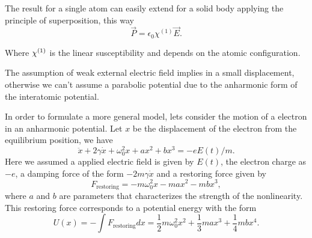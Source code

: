 The result for a single atom can easily extend for a solid body applying the principle of  superposition, this way
\begin{equation}
    \vec{P} = \epsilon_0\chi^{(1)}\vec{E}.
\end{equation}

Where $\chi^{( 1)}$ is the linear susceptibility and depends on the atomic configuration.

The assumption of weak external electric field implies in a small displacement, otherwise we can't assume a parabolic potential due to the anharmonic form of the interatomic potential. 

In order to formulate a more general model, lets consider the motion of a electron in an anharmonic potential. Let $x$ be the displacement of the electron from the equilibrium position, we have
\begin{equation}
    \ddot{x} + 2\gamma\dot{x} + \omega_0^2x+ax^2+bx^3 = -eE(t)/m.
    \label{eq:motion_equation_electron}
\end{equation}
Here we assumed a applied electric field is given by $E(t)$, the electron charge as $-e$, a damping force of the form $-2m\gamma\dot{x}$ and a restoring force given by
\begin{equation}
    F_\text{restoring} = -m\omega_0^2x -max^2 -mbx^3, 
\end{equation}
where $a$ and $b$ are parameters that characterizes the strength of the nonlinearity. This restoring force corresponds to a potential energy with the form 
\begin{equation}
    U(x) = -\int F_\text{restoring} dx = \frac{1}{2}m\omega_0^2x^2 +\frac{1}{3}max^3 +\frac{1}{4}mbx^4.
\end{equation}

